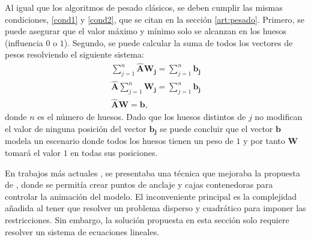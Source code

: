 Al igual que los algoritmos de pesado clásicos, se deben cumplir las mismas condiciones, \ref{cond1} y \ref{cond2}, que se citan en la sección \ref{art:pesado}. %
Primero, se puede asegurar que el valor máximo y mínimo solo se alcanzan en los huesos (influencia $0$ o $1$).
Segundo, se puede calcular la suma de todos los vectores de pesos resolviendo el siguiente sistema:
\begin{eqnarray}
\sum^{n}_{j=1} \mathbf{\hat{A}} \mathbf{W_j} = \sum^{n}_{j=1} \mathbf{b_j} \\
\mathbf{\hat{A}} \sum^{n}_{j=1} \mathbf{W_j} = \sum^{n}_{j=1}\mathbf{b_j} \\
\mathbf{\hat{A}} \mathbf{W}=\mathbf{b},
\end{eqnarray}
donde $n$ es el número de huesos. Dado que los huesos distintos de $j$ no modifican el valor de ninguna posición del vector $\mathbf{b_j}$ se puede concluir que el vector $\mathbf{b}$ modela un escenario donde todos los huesos tienen un peso de $1$ y por tanto $\mathbf{W}$  tomará el valor $1$ en todas sus posiciones. 





En trabajos más actuales \cite{Jacobson:2011}, se presentaba una técnica que mejoraba la propuesta de \cite{Baran:2007}, donde se permitía crear puntos de anclaje y cajas contenedoras para controlar la animación del modelo. 
El inconveniente principal es la complejidad añadida al tener que resolver un problema disperso y cuadrático para imponer las restricciones. Sin embargo, la solución propuesta en esta sección solo requiere resolver un sistema de ecuaciones lineales. 


